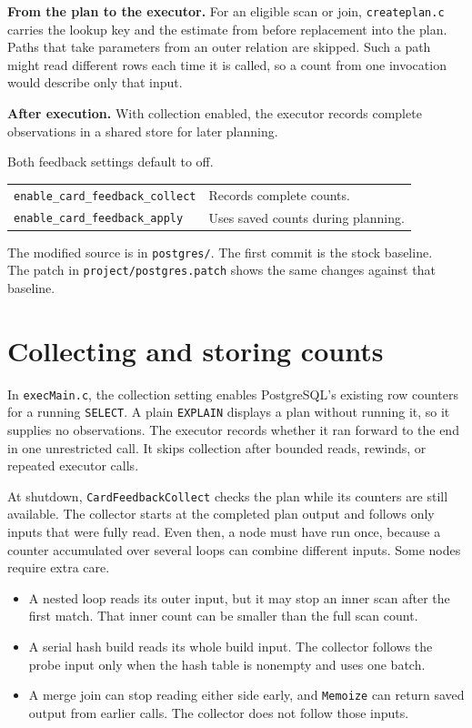\documentclass[11pt,a4paper]{article}
\begin{document}
\textbf{From the plan to the executor.} For an eligible scan or join,
\texttt{createplan.c} carries the lookup key and the estimate from before
replacement into the plan. Paths that take parameters from an outer relation
are skipped. Such a path might read different rows each time it is called, so a
count from one invocation would describe only that input.

\textbf{After execution.} With collection enabled, the executor records
complete observations in a shared store for later planning.

Both feedback settings default to off.

\begin{tabular}{@{}ll@{}}
\texttt{enable\_card\_feedback\_collect} & Records complete counts. \\
\texttt{enable\_card\_feedback\_apply} & Uses saved counts during planning. \\
\end{tabular}

The modified source is in \texttt{postgres/}. The first commit is the stock
baseline.\\
The patch in \texttt{project/postgres.patch} shows the same changes against
that baseline.

\newpage

\section*{Collecting and storing counts}
In \texttt{execMain.c}, the collection setting enables PostgreSQL's existing
row counters for a running \texttt{SELECT}. A plain \texttt{EXPLAIN} displays
a plan without running it, so it supplies no observations. The executor records
whether it ran forward to the end in one unrestricted call. It skips collection
after bounded reads, rewinds, or repeated executor calls.

At shutdown, \texttt{CardFeedbackCollect} checks the plan while its counters
are still available. The collector starts at the completed plan output and
follows only inputs that were fully read. Even then, a node must have run once,
because a counter accumulated over several loops can combine different
inputs. Some nodes require extra care.

\begin{itemize}
\item A nested loop reads its outer input, but it may stop an inner scan after
  the first match. That inner count can be smaller than the full scan count.
\item A serial hash build reads its whole build input. The collector follows
  the probe input only when the hash table is nonempty and uses one batch.
\item A merge join can stop reading either side early, and \texttt{Memoize}
  can return saved output from earlier calls. The collector does not follow
  those inputs.
\end{itemize}
\end{document}
